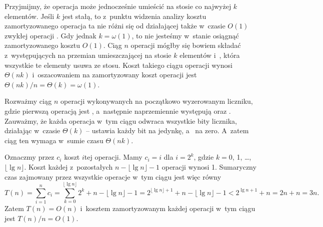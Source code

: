 
\exercise %
Przyjmijmy, że operacja  może jednocześnie umieścić na stosie co najwyżej $k$ elementów.
Jeśli $k$ jest stałą, to z~punktu widzenia analizy kosztu zamortyzowanego operacja ta nie różni się od działającej także w~czasie $O(1)$ zwykłej operacji .
Gdy jednak $k=\omega(1)$, to nie jesteśmy w~stanie osiągnąć zamortyzowanego kosztu $O(1)$.
Ciąg $n$ operacji mógłby się bowiem składać z~występujących na przemian  umieszczającej na stosie $k$ elementów i~, która wszystkie te elementy usuwa ze stosu.
Koszt takiego ciągu operacji wynosi $\Theta(nk)$ i~oszacowaniem na zamortyzowany koszt operacji jest $\Theta(nk)/n=\Theta(k)=\omega(1)$.

\exercise %
Rozważmy ciąg $n$ operacji wykonywanych na początkowo wyzerowanym liczniku, gdzie pierwszą operacją jest , a~następnie naprzemiennie występują  oraz .
Zauważmy, że każda operacja w~tym ciągu odwraca wszystkie bity licznika, działając w~czasie $\Theta(k)$ --  ustawia każdy bit na jedynkę, a~ na zero.
A~zatem ciąg ten wymaga w~sumie czasu $\Theta(nk)$.

\exercise %
Oznaczmy przez $c_i$ koszt $i$\nbhyphen tej operacji.
Mamy $c_i=i$ dla $i=2^k$, gdzie $k=0$, 1, \dots, $\lfloor\lg n\rfloor$.
Koszt każdej z~pozostałych $n-\lfloor\lg n\rfloor-1$ operacji wynosi 1.
Sumaryczny czas zajmowany przez wszystkie operacje w~tym ciągu jest więc równy
\[
	T(n) = \sum_{i=1}^nc_i = \sum_{k=0}^{\lfloor\lg n\rfloor}2^k+n-\lfloor\lg n\rfloor-1 = 2^{\lfloor\lg n\rfloor+1}+n-\lfloor\lg n\rfloor-1 < 2^{\lg n+1}+n = 2n+n = 3n.
\]
Zatem $T(n)=O(n)$ i~kosztem zamortyzowanym każdej operacji w~tym ciągu jest $T(n)/n=O(1)$.
